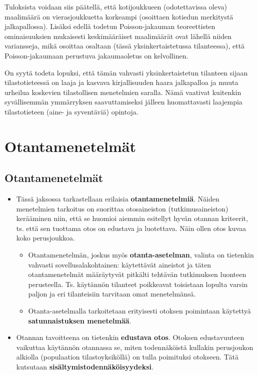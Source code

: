 \documentclass[
]{book}
\providecommand{\tightlist}{%
  \setlength{\itemsep}{0pt}\setlength{\parskip}{0pt}}
\begin{document}
\begin{eblock}{}
Tuloksista voidaan siis päätellä, että kotijoukkueen (odotettavissa oleva) maalimäärä on vierasjoukkuetta korkeampi (osoittaen kotiedun merkitystä jalkapallossa). Lisäksi edellä todetun Poisson-jakauman teoreettisten ominaisuuksien mukaisesti keskimääräiset maalimäärät ovat lähellä niiden variansseja, mikä osoittaa osaltaan (tässä yksinkertaistetussa tilanteessa), että Poisson-jakaumaan perustuva jakaumaoletus on kelvollinen.

On syytä todeta lopuksi, että tämän vahvasti yksinkertaistetun tilanteen sijaan tilastotieteessä on laaja ja kasvava kirjallisuuden haara jalkapalloa ja muuta urheilua koskevien tilastollisen menetelmien saralla. Nämä vaativat kuitenkin syvällisemmän ymmärryksen saavuttamiseksi jälleen huomattavasti laajempia tilastotieteen (aine- ja syventäviä) opintoja.

\end{eblock}

\hypertarget{luku8}{%
\chapter{Otantamenetelmät}\label{luku8}}

\hypertarget{alaluku81}{%
\section{Otantamenetelmät}\label{alaluku81}}

\begin{itemize}
\tightlist
\item
  Tässä jaksossa tarkastellaan erilaisia \textbf{otantamenetelmiä}. Näiden menetelmien tarkoitus on suorittaa otosaineiston (tutkimusaineiston) kerääminen niin, että se huomioi aiemmin esitellyt hyvän otannan kriteerit, ts. että sen tuottama otos on edustava ja luotettava. Näin ollen otos kuvaa koko perusjoukkoa.

  \begin{itemize}
  \tightlist
  \item
    Otantamenetelmän, joskus myös \textbf{otanta-asetelman}, valinta on tietenkin vahvasti sovellusalakohtainen: käytettävät aineistot ja täten otantamenetelmät määräytyvät pitkälti tehtävän tutkimuksen luonteen perusteella. Ts. käytännön tilanteet poikkeavat toisistaan lopulta varsin paljon ja eri tilanteisiin tarvitaan omat menetelmänsä.
  \item
    Otanta-asetelmalla tarkoitetaan erityisesti otoksen poimintaan käytettyä \textbf{satunnaistuksen menetelmää}.
  \end{itemize}
\item
  Otannan tavoitteena on tietenkin \textbf{edustava otos}. Otoksen edustavuuteen vaikuttaa käytännön otannassa se, miten todennäköistä kullakin perusjoukon alkiolla (populaation tilastoyksiköllä) on tulla poimituksi otokseen. Tätä kutsutaan \textbf{sisältymistodennäköisyydeksi}.
\end{itemize}
\end{document}
